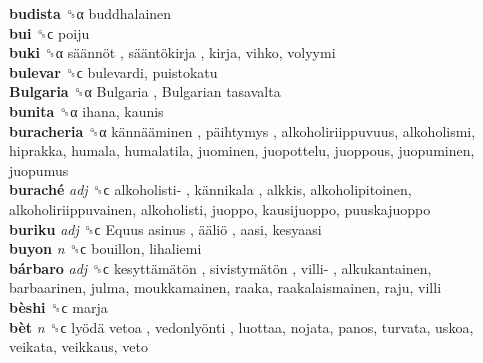 \textbf{budista} ␝α  buddhalainen  \\
\textbf{bui} ␝ϲ  poiju  \\
\textbf{buki} ␝α   säännöt ,  sääntökirja , kirja, vihko, volyymi  \\
\textbf{bulevar} ␝ϲ  bulevardi, puistokatu  \\
\textbf{Bulgaria} ␝α   Bulgaria ,  Bulgarian tasavalta   \\
\textbf{bunita} ␝α  ihana, kaunis  \\
\textbf{buracheria} ␝α   kännääminen ,  päihtymys , alkoholiriippuvuus, alkoholismi, hiprakka, humala, humalatila, juominen, juopottelu, juoppous, juopuminen, juopumus  \\
\textbf{buraché} \emph{adj}  ␝ϲ   alkoholisti- ,  kännikala , alkkis, alkoholipitoinen, alkoholiriippuvainen, alkoholisti, juoppo, kausijuoppo, puuskajuoppo  \\
\textbf{buriku} \emph{adj}  ␝ϲ   Equus asinus ,  ääliö , aasi, kesyaasi  \\
\textbf{buyon} \emph{n}  ␝ϲ  bouillon, lihaliemi  \\
\textbf{bárbaro} \emph{adj}  ␝ϲ   kesyttämätön ,  sivistymätön ,  villi- , alkukantainen, barbaarinen, julma, moukkamainen, raaka, raakalaismainen, raju, villi  \\
\textbf{bèshi} ␝ϲ  marja  \\
\textbf{bèt} \emph{n}  ␝ϲ   lyödä vetoa ,  vedonlyönti , luottaa, nojata, panos, turvata, uskoa, veikata, veikkaus, veto  \\
